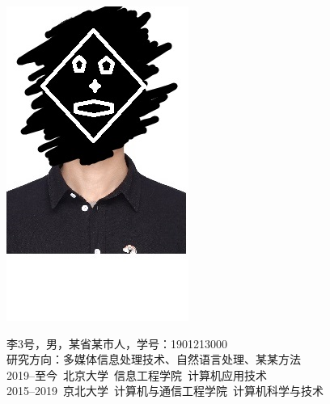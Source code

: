 {%
\begin{minipage}{0.13\linewidth}
    \includegraphics[width=\linewidth]{image/avatar.jpg}
    \end{minipage}
    \hfill
    \begin{minipage}{0.87\linewidth}
        李3号，男，某省某市人，学号：1901213000 \\
        研究方向：多媒体信息处理技术、自然语言处理、某某方法 \\
        2019–至今~北京大学~信息工程学院~计算机应用技术 \\
        2015–2019~京北大学~计算机与通信工程学院~计算机科学与技术 \\
\end{minipage}

}


